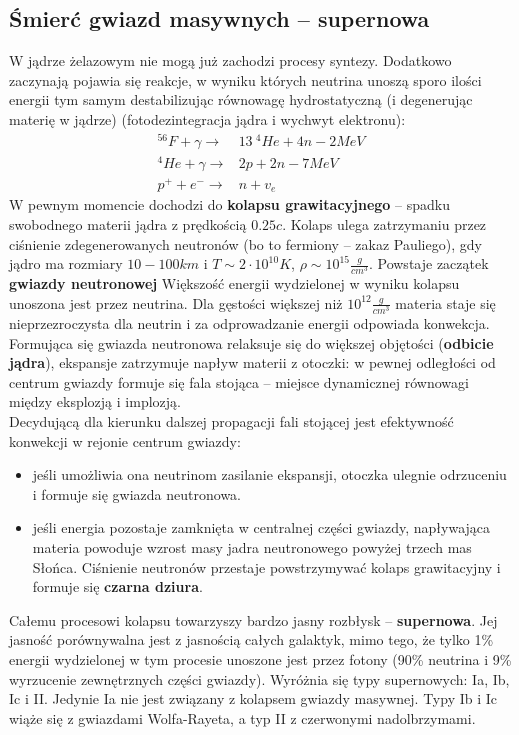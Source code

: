 \documentclass[../index.tex]{subfiles}
\begin{document}
        \subsection{Śmierć gwiazd masywnych – supernowa}
            W jądrze żelazowym nie mogą już zachodzi procesy syntezy. Dodatkowo zaczynają pojawia się reakcje, w wyniku których neutrina unoszą sporo ilości energii tym samym destabilizując równowagę hydrostatyczną (i degenerując materię w jądrze) (fotodezintegracja jądra i wychwyt elektronu):
            \begin{align}
                ^{56}F + \gamma \to& 13 \:^4He + 4n - 2 MeV \\
                ^4He  + \gamma \to& 2p + 2n - 7MeV \\
                p^{ +} + e^{ -} \to& n + v_e
            \end{align}
            W pewnym momencie dochodzi do \textbf{kolapsu grawitacyjnego} – spadku swobodnego materii jądra z prędkością \(0.25 c\). Kolaps ulega zatrzymaniu przez ciśnienie zdegenerowanych neutronów (bo to fermiony – zakaz Pauliego), gdy jądro ma rozmiary \(10 - 100km\) i \(T\sim 2 \cdot 10^{10}K\), \(\rho \sim 10^{15} \frac{g}{cm^3}\). Powstaje zaczątek \textbf{gwiazdy neutronowej} Większość energii wydzielonej w wyniku kolapsu unoszona jest przez neutrina. Dla gęstości większej niż \(10^{12}\frac{g}{cm^3}\) materia staje się nieprzezroczysta dla neutrin i za odprowadzanie energii odpowiada konwekcja. Formująca się gwiazda neutronowa relaksuje się do większej objętości (\textbf{odbicie jądra}), ekspansje zatrzymuje napływ materii z otoczki: w pewnej odległości od centrum gwiazdy formuje się fala stojąca – miejsce dynamicznej równowagi między eksplozją i implozją.\\
            Decydującą dla kierunku dalszej propagacji fali stojącej jest efektywność konwekcji w rejonie centrum gwiazdy:
            \begin{itemize}
                \item jeśli umożliwia ona neutrinom zasilanie ekspansji, otoczka ulegnie odrzuceniu i formuje się gwiazda neutronowa.
                \item jeśli energia pozostaje zamknięta w centralnej części gwiazdy, napływająca materia powoduje wzrost masy jadra neutronowego powyżej trzech mas Słońca. Ciśnienie neutronów przestaje powstrzymywać kolaps grawitacyjny i formuje się \textbf{czarna dziura}.
            \end{itemize}
            Całemu procesowi kolapsu towarzyszy bardzo jasny rozbłysk – \textbf{supernowa}. Jej jasność porównywalna jest z jasnością całych galaktyk, mimo tego, że tylko 1\% energii wydzielonej w tym procesie unoszone jest przez fotony (90\% neutrina i 9\% wyrzucenie zewnętrznych części gwiazdy). Wyróżnia się typy supernowych: Ia, Ib, Ic i II. Jedynie Ia nie jest związany z kolapsem gwiazdy masywnej. Typy Ib i Ic wiąże się z gwiazdami Wolfa-Rayeta, a typ II z czerwonymi nadolbrzymami.\\
\end{document}
